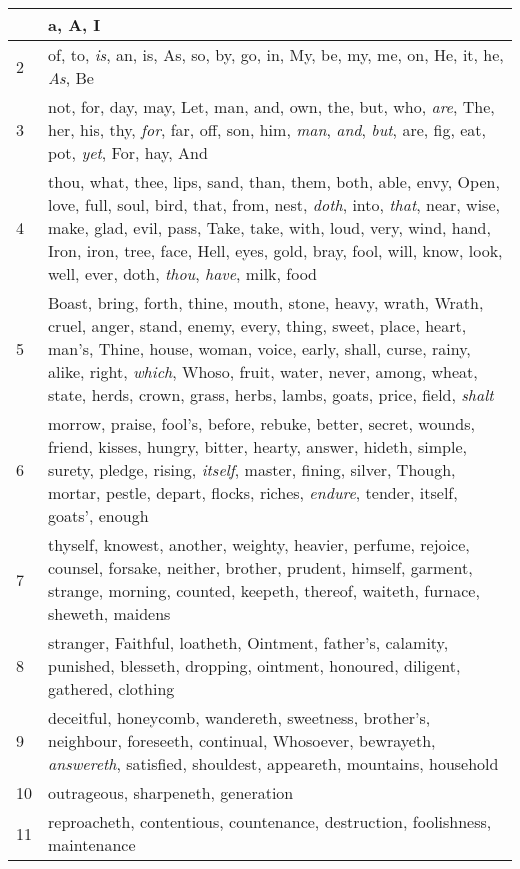 \begin{center}
\begin{longtable}{l|p{3.75in}}
\hline \hline 
\endlastfoot 
1 & a, A, I\\ \hline 
2 & of, to, \emph{is}, an, is, As, so, by, go, in, My, be, my, me, on, He, it, he, \emph{As}, Be\\ \hline 
3 & not, for, day, may, Let, man, and, own, the, but, who, \emph{are}, The, her, his, thy, \emph{for}, far, off, son, him, \emph{man}, \emph{and}, \emph{but}, are, fig, eat, pot, \emph{yet}, For, hay, And\\ \hline 
4 & thou, what, thee, lips, sand, than, them, both, able, envy, Open, love, full, soul, bird, that, from, nest, \emph{doth}, into, \emph{that}, near, wise, make, glad, evil, pass, Take, take, with, loud, very, wind, hand, Iron, iron, tree, face, Hell, eyes, gold, bray, fool, will, know, look, well, ever, doth, \emph{thou}, \emph{have}, milk, food\\ \hline 
5 & Boast, bring, forth, thine, mouth, stone, heavy, wrath, Wrath, cruel, anger, stand, enemy, every, thing, sweet, place, heart, man's, Thine, house, woman, voice, early, shall, curse, rainy, alike, right, \emph{which}, Whoso, fruit, water, never, among, wheat, state, herds, crown, grass, herbs, lambs, goats, price, field, \emph{shalt}\\ \hline 
6 & morrow, praise, fool's, before, rebuke, better, secret, wounds, friend, kisses, hungry, bitter, hearty, answer, hideth, simple, surety, pledge, rising, \emph{itself}, master, fining, silver, Though, mortar, pestle, depart, flocks, riches, \emph{endure}, tender, itself, goats', enough\\ \hline 
7 & thyself, knowest, another, weighty, heavier, perfume, rejoice, counsel, forsake, neither, brother, prudent, himself, garment, strange, morning, counted, keepeth, thereof, waiteth, furnace, sheweth, maidens\\ \hline 
8 & stranger, Faithful, loatheth, Ointment, father's, calamity, punished, blesseth, dropping, ointment, honoured, diligent, gathered, clothing\\ \hline 
9 & deceitful, honeycomb, wandereth, sweetness, brother's, neighbour, foreseeth, continual, Whosoever, bewrayeth, \emph{answereth}, satisfied, shouldest, appeareth, mountains, household\\ \hline 
10 & outrageous, sharpeneth, generation\\ \hline 
11 & reproacheth, contentious, countenance, destruction, foolishness, maintenance\\ \hline 
\end{longtable} 
\end{center} 




 
